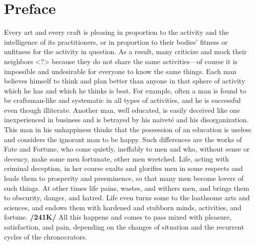 \section{Preface}

Every art and every craft is pleasing in proportion to the activity and the intelligence of its practitioners, or in proportion to their bodies’ fitness or unfitness for the activity in question. As a result, many criticize and mock their neighbors <?> because they do not share the same activities—of course it is impossible and undesirable for everyone to know the same things. Each man believes himself to think and
plan better than anyone in that sphere of activity which he has and which he thinks is best. For example, often a man is found to be craftsman-like and systematic in all types of activities, and he is successful even though illiterate. Another man, well educated, is easily deceived like one inexperienced in business and is betrayed by his naiveté and his disorganization. This man in his unhappiness thinks that the possession of an education is useless and considers the ignorant man to be happy. Such differences are the works of Fate and Fortune, who come quietly, ineffably to men and who, without sense or decency, make some men fortunate, other men wretched. Life, acting with criminal deception, in her course exalts and glorifies men in some respects and leads them to prosperity and preeminence, so that many men become lovers of such things. At other times life pains, wastes, and withers men, and brings them to obscurity, danger, and hatred. Life even turns some to the loathsome arts and sciences, and endows them with hardened and stubborn minds, activities, and fortune. \textbf{/241K/} All this happens and comes to pass mixed with pleasure, satisfaction, and pain, depending on the changes of
situation and the recurrent cycles of the chronocrators. 

